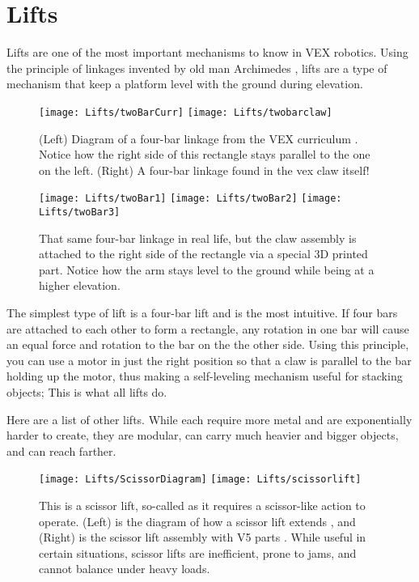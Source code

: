 \section{Lifts}

Lifts are one of the most important mechanisms to know in VEX robotics. Using the principle of linkages invented by old man Archimedes \cite{Linkage}, lifts are a type of mechanism that keep a platform level with the ground during elevation.

\begin{figure}[h]
    \centering
    \texttt{[image: Lifts/twoBarCurr]}
    \texttt{[image: Lifts/twobarclaw]}
    \caption{
    (Left) Diagram of a four-bar linkage from the VEX curriculum \cite{LinkageCurr}. Notice how the right side of this rectangle stays parallel to the one on the left. (Right) A four-bar linkage found in the vex claw itself!
    }
\end{figure}

\begin{figure}[h]
    \centering
    \texttt{[image: Lifts/twoBar1]}
    \texttt{[image: Lifts/twoBar2]}
    \texttt{[image: Lifts/twoBar3]}
    \caption{
    That same four-bar linkage in real life, but the claw assembly is attached to the right side of the rectangle via a special 3D printed part. Notice how the arm stays level to the ground while being at a higher elevation.
    }
\end{figure}

The simplest type of lift is a four-bar lift and is the most intuitive. If four bars are attached to each other to form a rectangle, any rotation in one bar will cause an equal force and rotation to the bar on the the other side. Using this principle, you can use a motor in just the right position so that a claw is parallel to the bar holding up the motor, thus making a self-leveling mechanism useful for stacking objects; This is what all lifts do.

Here are a list of other lifts. While each require more metal and are exponentially harder to create, they are modular, can carry much heavier and bigger objects, and can reach farther.


\begin{figure}[h]
    \centering
    \texttt{[image: Lifts/ScissorDiagram]}
    \texttt{[image: Lifts/scissorlift]}
    \caption{
    This is a scissor lift, so-called as it requires a scissor-like action to operate. (Left) is the diagram of how a scissor lift extends \cite{ScissorDiagram}, and (Right) is the scissor lift assembly with V5 parts \cite{V5Lifts}. While useful in certain situations, scissor lifts are inefficient, prone to jams, and cannot balance under heavy loads.
    }
\end{figure}


